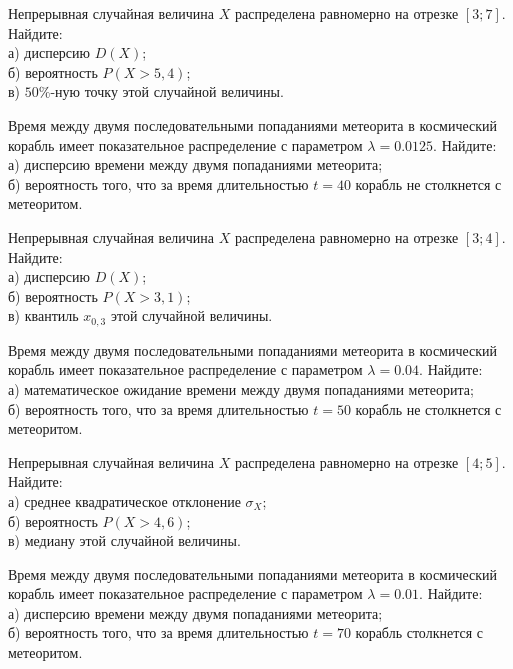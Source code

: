\vfill

\newpage\setcounter{zad}{0}

\z Непрерывная случайная величина $X$ распределена равномерно на отрезке $[3; 7]$. Найдите: \\ \quad а) дисперсию $D(X)$; \\ \quad б) вероятность $P(X>5{,}4)$; \\ \quad в) $50\%$-ную точку этой случайной величины.


\vfill

\z Время между двумя последовательными попаданиями метеорита в космический корабль имеет показательное распределение с параметром $\lambda = 0.0125$. Найдите: \\ \quad а) дисперсию времени между двумя попаданиями метеорита; \\ \quad б) вероятность того, что за время длительностью $t = 40$ корабль не столкнется с метеоритом.
 

\vfill

\newpage\setcounter{zad}{0}

\z Непрерывная случайная величина $X$ распределена равномерно на отрезке $[3; 4]$. Найдите: \\ \quad а) дисперсию $D(X)$; \\ \quad б) вероятность $P(X>3{,}1)$; \\ \quad в) квантиль $x_{0{,}3}$ этой случайной величины.


\vfill

\z Время между двумя последовательными попаданиями метеорита в космический корабль имеет показательное распределение с параметром $\lambda = 0.04$. Найдите: \\ \quad а) математическое ожидание времени между двумя попаданиями метеорита; \\ \quad б) вероятность того, что за время длительностью $t = 50$ корабль не столкнется с метеоритом.
 

\vfill

\newpage\setcounter{zad}{0}

\z Непрерывная случайная величина $X$ распределена равномерно на отрезке $[4; 5]$. Найдите: \\ \quad а) среднее квадратическое отклонение $\sigma_X$; \\ \quad б) вероятность $P(X>4{,}6)$; \\ \quad в) медиану этой случайной величины.


\vfill

\z Время между двумя последовательными попаданиями метеорита в космический корабль имеет показательное распределение с параметром $\lambda = 0.01$. Найдите: \\ \quad а) дисперсию времени между двумя попаданиями метеорита; \\ \quad б) вероятность того, что за время длительностью $t = 70$ корабль  столкнется с метеоритом.
 

